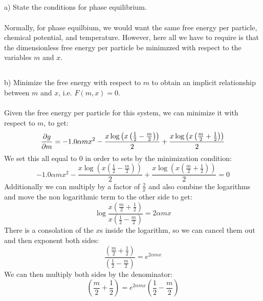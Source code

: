\documentclass[12pt]{article}
\begin{document}
\subsection{}
a) State the conditions for phase equilibrium.\\\\
 Normally, for phase equilbium, we would want the same free energy per particle,  chemical potential, and temperature. However, here all we have to require is that the dimensionless free energy per particle be minimzzed with respect to the variables $m$ and $x$.
\subsection{}
b) Minimize the free energy with respect to $m$ to obtain an implicit relationship between $m$ and $x$, i.e. $F(m, x)=0$.\\\\
Given the free energy per particle for this system, we can minimize it with respect to $m$, to get:
\begin{equation}
  \pdv{g}{m} = - 1.0 \alpha m x^{2} - \frac{x \log{\left(x \left(\frac{1}{2} - \frac{m}{2}\right) \right)}}{2} + \frac{x \log{\left(x \left(\frac{m}{2} + \frac{1}{2}\right) \right)}}{2}
\end{equation}
We set this all equal to 0 in order to sets by the minimization condition:
\begin{equation}
  - 1.0 \alpha m x^{2} - \frac{x \log{\left(x \left(\frac{1}{2} - \frac{m}{2}\right) \right)}}{2} + \frac{x \log{\left(x \left(\frac{m}{2} + \frac{1}{2}\right) \right)}}{2} = 0
\end{equation}
Additionally we can multiply by a factor of $\frac{2}{x}$ and also combine the logarithms and move the non logarithmic term to the other side to get:
\begin{equation}
  \log{\frac{x\left( \frac{m}{2} + \frac{1}{2} \right)}{x\left( \frac{1}{2} - \frac{m}{2} \right)}} = 2\alpha mx
\end{equation}
There is a consolation of the $x$s inside the logarithm, so we can cancel them out and then exponent both sides:
\begin{equation}
  \frac{\left( \frac{m}{2} + \frac{1}{2} \right)}{\left( \frac{1}{2} - \frac{m}{2} \right)} = e^{2\alpha mx}
\end{equation}
We can then multiply both sides by the denominator:
\begin{equation}
  \left( \frac{m}{2} + \frac{1}{2} \right) = e^{2\alpha mx} \left( \frac{1}{2} - \frac{m}{2} \right)
\end{equation}
\end{document}
